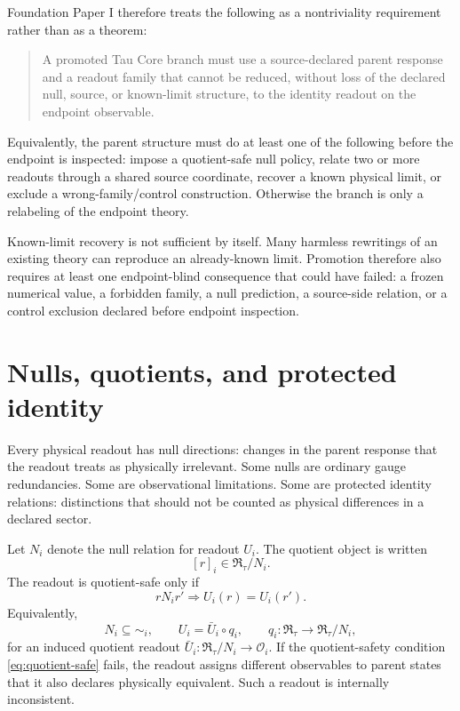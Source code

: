 \documentclass[11pt]{article}
\newcommand{\RTspace}{\mathfrak R_{\tau}}
\newcommand{\Obs}{\mathcal O}
\begin{document}
Foundation Paper I therefore treats the following as a nontriviality
requirement rather than as a theorem:
\begin{quote}
A promoted Tau Core branch must use a source-declared parent response and a
readout family that cannot be reduced, without loss of the declared null,
source, or known-limit structure, to the identity readout on the endpoint
observable.
\end{quote}
Equivalently, the parent structure must do at least one of the following before
the endpoint is inspected: impose a quotient-safe null policy, relate two or
more readouts through a shared source coordinate, recover a known physical
limit, or exclude a wrong-family/control construction.  Otherwise the branch is
only a relabeling of the endpoint theory.

Known-limit recovery is not sufficient by itself.  Many harmless rewritings of
an existing theory can reproduce an already-known limit.  Promotion therefore
also requires at least one endpoint-blind consequence that could have failed:
a frozen numerical value, a forbidden family, a null prediction, a source-side
relation, or a control exclusion declared before endpoint inspection.

\section{Nulls, quotients, and protected identity}

Every physical readout has null directions: changes in the parent response
that the readout treats as physically irrelevant.  Some nulls are ordinary
gauge redundancies.  Some are observational limitations.  Some are protected
identity relations: distinctions that should not be counted as physical
differences in a declared sector.

Let \(N_i\) denote the null relation for readout \(U_i\).  The quotient object
is written
\[
  [r]_i \in \RTspace/N_i.
\]
The readout is quotient-safe only if
\begin{equation}
  r N_i r' \Longrightarrow U_i(r)=U_i(r').
  \tag{QS}
  \label{eq:quotient-safe}
\end{equation}
Equivalently,
\[
  N_i\subseteq \sim_i,
  \qquad
  U_i=\bar U_i\circ q_i,
  \qquad
  q_i:\RTspace\to\RTspace/N_i,
\]
for an induced quotient readout \(\bar U_i:\RTspace/N_i\to\Obs_i\).
If the quotient-safety condition \eqref{eq:quotient-safe} fails, the readout
assigns different observables to parent states that it also declares physically
equivalent.  Such a readout is internally inconsistent.
\end{document}
